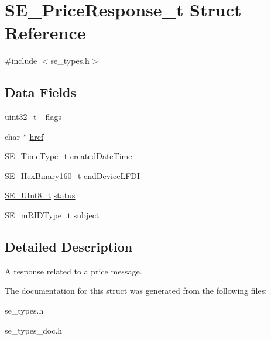 \hypertarget{structSE__PriceResponse__t}{}\section{S\+E\+\_\+\+Price\+Response\+\_\+t Struct Reference}
\label{structSE__PriceResponse__t}


{\ttfamily \#include $<$se\+\_\+types.\+h$>$}

\subsection*{Data Fields}
\begin{DoxyCompactItemize}
\item 
uint32\+\_\+t \hyperlink{group__PriceResponse_ga03c805f3561a787a08ee7d85f906c991}{\+\_\+flags}
\item 
char $\ast$ \hyperlink{group__PriceResponse_ga74e2af000045c4743754d6a2c585fbed}{href}
\item 
\hyperlink{group__TimeType_ga6fba87a5b57829b4ff3f0e7638156682}{S\+E\+\_\+\+Time\+Type\+\_\+t} \hyperlink{group__PriceResponse_gaca058e6a4b9bdabf0802cbab15dc0df2}{created\+Date\+Time}
\item 
\hyperlink{group__HexBinary160_ga92b92aa55555bdb75f3a59060f2c1632}{S\+E\+\_\+\+Hex\+Binary160\+\_\+t} \hyperlink{group__PriceResponse_ga690190c08ea8f2142672cca33e552a08}{end\+Device\+L\+F\+DI}
\item 
\hyperlink{group__UInt8_gaf7c365a1acfe204e3a67c16ed44572f5}{S\+E\+\_\+\+U\+Int8\+\_\+t} \hyperlink{group__PriceResponse_ga1660cfe81626577fdff445d0503634ff}{status}
\item 
\hyperlink{group__mRIDType_gac74622112f3a388a2851b2289963ba5e}{S\+E\+\_\+m\+R\+I\+D\+Type\+\_\+t} \hyperlink{group__PriceResponse_ga63c19ee87750d603c251c988496b702e}{subject}
\end{DoxyCompactItemize}


\subsection{Detailed Description}
A response related to a price message. 

The documentation for this struct was generated from the following files\+:\begin{DoxyCompactItemize}
\item 
se\+\_\+types.\+h\item 
se\+\_\+types\+\_\+doc.\+h\end{DoxyCompactItemize}
